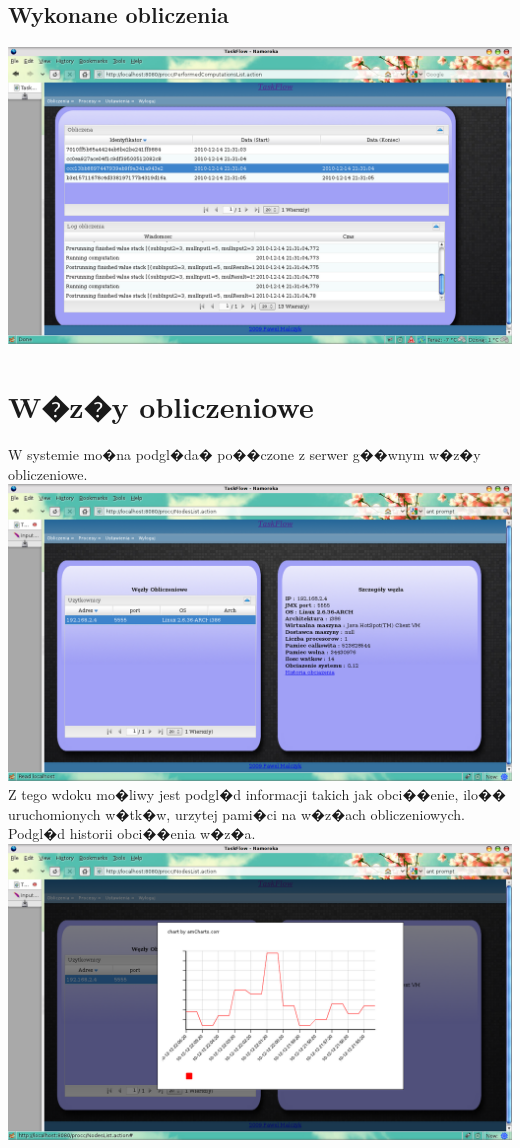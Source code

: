 \documentclass{article}
\begin{document}
\subsection{Wykonane obliczenia}
\includegraphics[scale=0.4]{img/prc4.png}

\section{W�z�y obliczeniowe}
W systemie mo�na podgl�da� po��czone z serwer g��wnym w�z�y obliczeniowe.\newline
\newline
\includegraphics[scale=0.4]{img/nodes.png}
\newline
Z tego wdoku mo�liwy jest podgl�d informacji takich jak obci��enie, ilo�� uruchomionych w�tk�w, urzytej pami�ci na w�z�ach obliczeniowych.
\newpage
Podgl�d historii obci��enia w�z�a.\newline \newline
\includegraphics[scale=0.4]{img/nodes_load.png}
\end{document}
